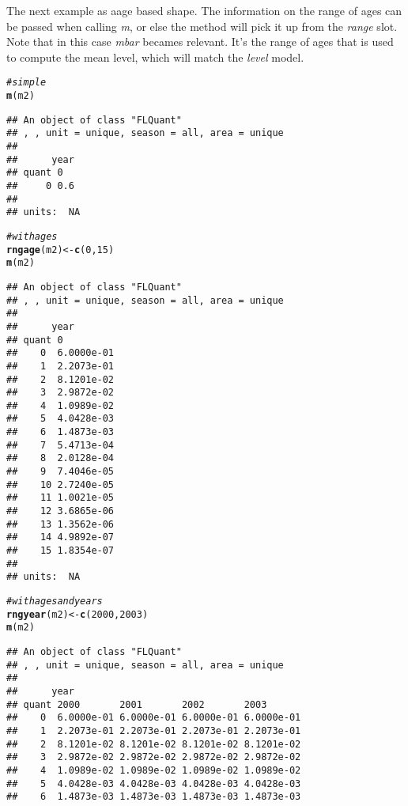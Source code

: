 \documentclass[a4paper,english,10pt]{article}\usepackage[]{graphicx}\usepackage[]{color}
\makeatletter
\newcommand{\hlnum}[1]{\textcolor[rgb]{0.686,0.059,0.569}{#1}}%
\newcommand{\hlcom}[1]{\textcolor[rgb]{0.678,0.584,0.686}{\textit{#1}}}%
\newcommand{\hlstd}[1]{\textcolor[rgb]{0.345,0.345,0.345}{#1}}%
\newcommand{\hlkwb}[1]{\textcolor[rgb]{0.69,0.353,0.396}{#1}}%
\newcommand{\hlkwd}[1]{\textcolor[rgb]{0.737,0.353,0.396}{\textbf{#1}}}%
\newenvironment{kframe}{%
 \def\at@end@of@kframe{}%
 \ifinner\ifhmode%
  \def\at@end@of@kframe{\end{minipage}}%
  \begin{minipage}{\columnwidth}%
 \fi\fi%
 \def\FrameCommand##1{\hskip\@totalleftmargin \hskip-\fboxsep
 \colorbox{shadecolor}{##1}\hskip-\fboxsep
     \hskip-\linewidth \hskip-\@totalleftmargin \hskip\columnwidth}%
 \MakeFramed {\advance\hsize-\width
   \@totalleftmargin\z@ \linewidth\hsize
   \@setminipage}}%
 {\par\unskip\endMakeFramed%
 \at@end@of@kframe}
\newenvironment{knitrout}{}{} %
\makeatother
\begin{document}
The next example as aage based shape. The information on the range of ages can be passed when calling \emph{m}, or else the method will pick it up from the \emph{range} slot. Note that in this case \emph{mbar} becames relevant. It's the range of ages that is used to compute the mean level, which will match the \emph{level} model.

\begin{knitrout}
\color{fgcolor}\begin{kframe}
\begin{alltt}
\hlcom{# simple}
\hlkwd{m}\hlstd{(m2)}
\end{alltt}
\begin{verbatim}
## An object of class "FLQuant"
## , , unit = unique, season = all, area = unique
## 
##      year
## quant 0  
##     0 0.6
## 
## units:  NA
\end{verbatim}
\begin{alltt}
\hlcom{# with ages}
\hlkwd{rngage}\hlstd{(m2)} \hlkwb{<-} \hlkwd{c}\hlstd{(}\hlnum{0}\hlstd{,} \hlnum{15}\hlstd{)}
\hlkwd{m}\hlstd{(m2)}
\end{alltt}
\begin{verbatim}
## An object of class "FLQuant"
## , , unit = unique, season = all, area = unique
## 
##      year
## quant 0         
##    0  6.0000e-01
##    1  2.2073e-01
##    2  8.1201e-02
##    3  2.9872e-02
##    4  1.0989e-02
##    5  4.0428e-03
##    6  1.4873e-03
##    7  5.4713e-04
##    8  2.0128e-04
##    9  7.4046e-05
##    10 2.7240e-05
##    11 1.0021e-05
##    12 3.6865e-06
##    13 1.3562e-06
##    14 4.9892e-07
##    15 1.8354e-07
## 
## units:  NA
\end{verbatim}
\begin{alltt}
\hlcom{# with ages and years}
\hlkwd{rngyear}\hlstd{(m2)} \hlkwb{<-} \hlkwd{c}\hlstd{(}\hlnum{2000}\hlstd{,} \hlnum{2003}\hlstd{)}
\hlkwd{m}\hlstd{(m2)}
\end{alltt}
\begin{verbatim}
## An object of class "FLQuant"
## , , unit = unique, season = all, area = unique
## 
##      year
## quant 2000       2001       2002       2003      
##    0  6.0000e-01 6.0000e-01 6.0000e-01 6.0000e-01
##    1  2.2073e-01 2.2073e-01 2.2073e-01 2.2073e-01
##    2  8.1201e-02 8.1201e-02 8.1201e-02 8.1201e-02
##    3  2.9872e-02 2.9872e-02 2.9872e-02 2.9872e-02
##    4  1.0989e-02 1.0989e-02 1.0989e-02 1.0989e-02
##    5  4.0428e-03 4.0428e-03 4.0428e-03 4.0428e-03
##    6  1.4873e-03 1.4873e-03 1.4873e-03 1.4873e-03

\end{verbatim}
\end{kframe}
\end{knitrout}
\end{document}
